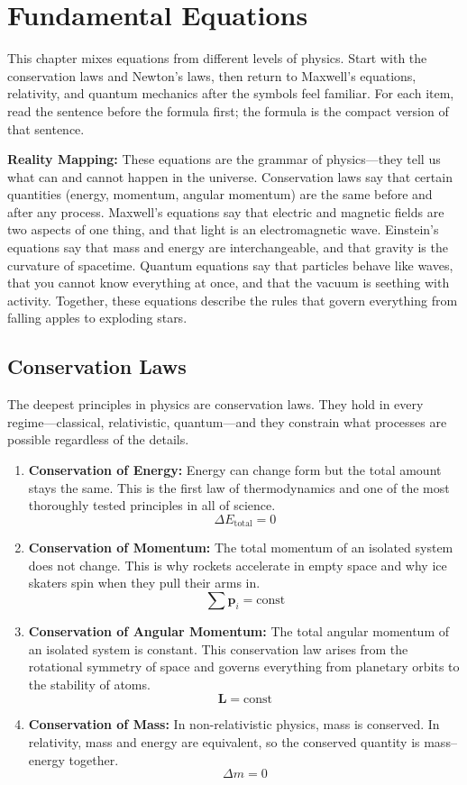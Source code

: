 \chapter{Fundamental Equations}

This chapter mixes equations from different levels of physics. Start with the conservation laws and Newton's laws, then return to Maxwell's equations, relativity, and quantum mechanics after the symbols feel familiar. For each item, read the sentence before the formula first; the formula is the compact version of that sentence.

\textbf{Reality Mapping:} These equations are the grammar of physics---they tell us what can and cannot happen in the universe. Conservation laws say that certain quantities (energy, momentum, angular momentum) are the same before and after any process. Maxwell's equations say that electric and magnetic fields are two aspects of one thing, and that light is an electromagnetic wave. Einstein's equations say that mass and energy are interchangeable, and that gravity is the curvature of spacetime. Quantum equations say that particles behave like waves, that you cannot know everything at once, and that the vacuum is seething with activity. Together, these equations describe the rules that govern everything from falling apples to exploding stars.

\section*{Conservation Laws}

The deepest principles in physics are conservation laws. They hold in every regime---classical, relativistic, quantum---and they constrain what processes are possible regardless of the details.

\begin{enumerate}

\item \textbf{Conservation of Energy:} Energy can change form but the total amount stays the same. This is the first law of thermodynamics and one of the most thoroughly tested principles in all of science.
\[
\Delta E_{\text{total}}=0
\]

\item \textbf{Conservation of Momentum:} The total momentum of an isolated system does not change. This is why rockets accelerate in empty space and why ice skaters spin when they pull their arms in.
\[
\sum \mathbf{p}_i = \text{const}
\]

\item \textbf{Conservation of Angular Momentum:} The total angular momentum of an isolated system is constant. This conservation law arises from the rotational symmetry of space and governs everything from planetary orbits to the stability of atoms.
\[
\mathbf{L} = \text{const}
\]

\item \textbf{Conservation of Mass:} In non-relativistic physics, mass is conserved. In relativity, mass and energy are equivalent, so the conserved quantity is mass--energy together.
\[
\Delta m = 0
\]

\end{enumerate}

